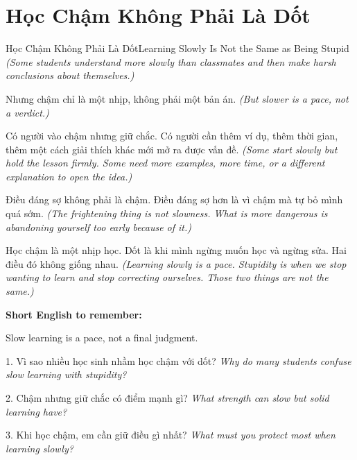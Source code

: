 \section{Học Chậm Không Phải Là Dốt}
\begin{truyen}{Học Chậm Không Phải Là Dốt}{Learning Slowly Is Not the Same as Being Stupid}
\textit{(Some students understand more slowly than classmates and then make harsh conclusions about themselves.)}

Nhưng chậm chỉ là một nhịp, không phải một bản án.
\textit{(But slower is a pace, not a verdict.)}

Có người vào chậm nhưng giữ chắc. Có người cần thêm ví dụ, thêm thời gian, thêm một cách giải thích khác mới mở ra được vấn đề.
\textit{(Some start slowly but hold the lesson firmly. Some need more examples, more time, or a different explanation to open the idea.)}

Điều đáng sợ không phải là chậm. Điều đáng sợ hơn là vì chậm mà tự bỏ mình quá sớm.
\textit{(The frightening thing is not slowness. What is more dangerous is abandoning yourself too early because of it.)}
\end{truyen}

\begin{baihoc}
Học chậm là một nhịp học. Dốt là khi mình ngừng muốn học và ngừng sửa. Hai điều đó không giống nhau.
\textit{(Learning slowly is a pace. Stupidity is when we stop wanting to learn and stop correcting ourselves. Those two things are not the same.)}
\end{baihoc}

\begin{ghinhoanh}
\textbf{Short English to remember:}

Slow learning is a pace, not a final judgment.

\end{ghinhoanh}

\begin{tuhocnhanh}
1. Vì sao nhiều học sinh nhầm học chậm với dốt? \textit{Why do many students confuse slow learning with stupidity?}

2. Chậm nhưng giữ chắc có điểm mạnh gì? \textit{What strength can slow but solid learning have?}

3. Khi học chậm, em cần giữ điều gì nhất? \textit{What must you protect most when learning slowly?}
\end{tuhocnhanh}
\ngancach

